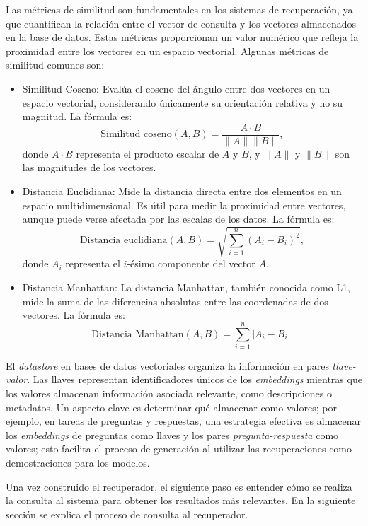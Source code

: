 \documentclass{article}
\begin{document}
Las métricas de similitud son fundamentales en los sistemas de recuperación, ya que cuantifican la relación entre el vector de consulta y los vectores almacenados en la base de datos. Estas métricas proporcionan un valor numérico que refleja la proximidad entre los vectores en un espacio vectorial. Algunas métricas de similitud comunes son:

\begin{itemize}
    \item Similitud Coseno: Evalúa el coseno del ángulo entre dos vectores en un espacio vectorial, considerando únicamente su orientación relativa y no su magnitud. La fórmula es:
    \[
    \text{Similitud coseno}(A, B) = \frac{A \cdot B}{\|A\| \|B\|},
    \]
    donde \(A \cdot B\) representa el producto escalar de \(A\) y \(B\), y \(\|A\|\) y \(\|B\|\) son las magnitudes de los vectores.
    
    \item Distancia Euclidiana: Mide la distancia directa entre dos elementos en un espacio multidimensional. Es útil para medir la proximidad entre vectores, aunque puede verse afectada por las escalas de los datos. La fórmula es:
    \[
    \text{Distancia euclidiana}(A, B) = \sqrt{\sum_{i=1}^{n} (A_i - B_i)^2},
    \]
    donde \(A_i\) representa el $i$-ésimo componente del vector \(A\).
    
    \item Distancia Manhattan: La distancia Manhattan, también conocida como L1, mide la suma de las diferencias absolutas entre las coordenadas de dos vectores. La fórmula es:
    \[
    \text{Distancia Manhattan}(A, B) = \sum_{i=1}^{n} |A_i - B_i|.
    \]
\end{itemize}

El \textit{datastore} en bases de datos vectoriales organiza la información en pares \textit{llave-valor}. Las llaves representan identificadores únicos de los \textit{embeddings} mientras que los valores almacenan información asociada relevante, como descripciones o metadatos. Un aspecto clave es determinar qué almacenar como valores; por ejemplo, en tareas de preguntas y respuestas, una estrategia efectiva es almacenar los \textit{embeddings} de preguntas como llaves y los pares \textit{pregunta-respuesta} como valores; esto facilita el proceso de generación al utilizar las recuperaciones como demostraciones para los modelos.

Una vez construido el recuperador, el siguiente paso es entender cómo se realiza la consulta al sistema para obtener los resultados más relevantes. En la siguiente sección se explica el proceso de consulta al recuperador.
\end{document}
